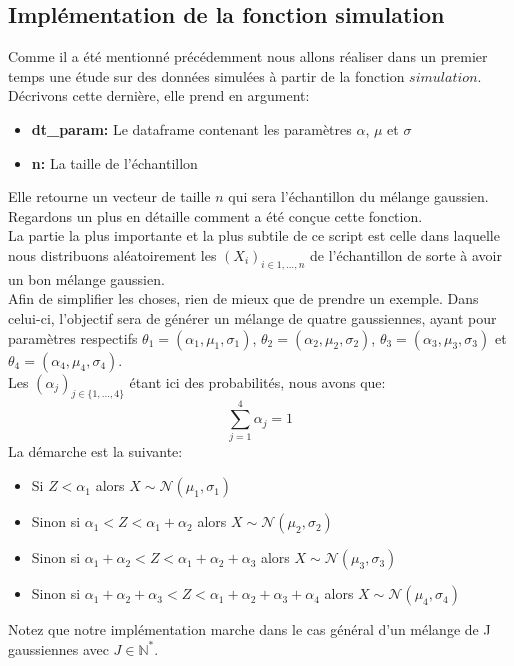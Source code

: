 \documentclass[a4paper,french,10pt]{article}
\begin{document}
\subsection{Implémentation de la fonction simulation}
Comme il a été mentionné précédemment nous allons réaliser dans un premier temps une étude sur des données simulées à partir de la fonction $simulation$. Décrivons cette dernière, elle prend en argument:
\begin{itemize}
	\item \textbf{dt\_param:} Le dataframe contenant les paramètres $\alpha$, $\mu$ et $\sigma$
	\item \textbf{n:} La taille de l'échantillon
\end{itemize}
Elle retourne un vecteur de taille $n$ qui sera l'échantillon du mélange gaussien. \\ Regardons un plus en détaille comment a été conçue cette fonction. \\
La partie la plus importante et la plus subtile de ce script est celle dans laquelle nous distribuons aléatoirement les $(X_i)_{i \in 1,\dots,n}$ de l'échantillon de sorte à avoir un bon mélange gaussien. \\
Afin de simplifier les choses, rien de mieux que de prendre un exemple. Dans celui-ci, l'objectif sera de générer un mélange de quatre gaussiennes, ayant pour paramètres respectifs $\theta_1 = (\alpha_1, \mu_1, \sigma_1)$, $\theta_2 = (\alpha_2, \mu_2, \sigma_2)$, $\theta_3 = (\alpha_3, \mu_3, \sigma_3)$ et $\theta_4 = (\alpha_4, \mu_4, \sigma_4)$. \\
Les $(\alpha_j)_{j \in \{1,\dots,4\}}$ étant ici des probabilités, nous avons que:
\[
	\sum_{j=1}^{4} \alpha_{j} = 1
\]
La démarche est la suivante:
\begin{itemize}
	\item Si $Z < \alpha_1$ alors $X \sim \mathcal{N}(\mu_1, \sigma_1)$
	\item Sinon si $\alpha_1 < Z < \alpha_1 + \alpha_2$ alors $X \sim \mathcal{N}(\mu_2, \sigma_2)$
	\item Sinon si $\alpha_1 + \alpha_2 < Z < \alpha_1 + \alpha_2 + \alpha_3$ alors $X \sim \mathcal{N}(\mu_3, \sigma_3)$
	\item Sinon si $\alpha_1 + \alpha_2 + \alpha_3 < Z < \alpha_1 + \alpha_2 + \alpha_3 + \alpha_4$ alors $X \sim \mathcal{N}(\mu_4, \sigma_4)$
\end{itemize}
Notez que notre implémentation marche dans le cas général d'un mélange de J gaussiennes avec $J \in \mathbb{N}^{*}$.
\end{document}
